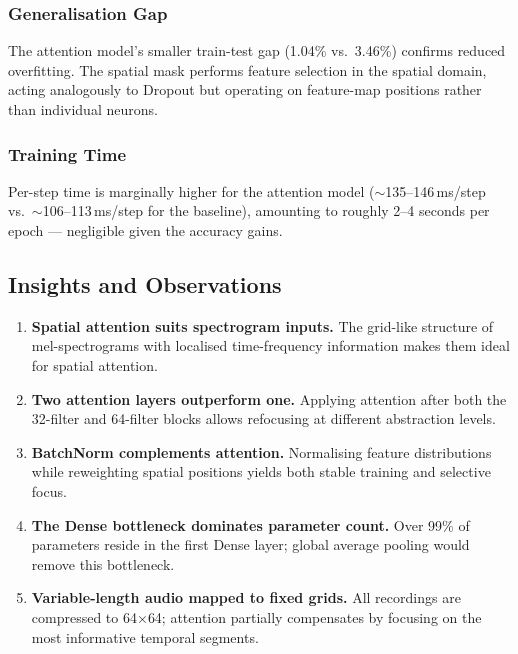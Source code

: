 \documentclass[12pt,a4paper]{article}
\begin{document}
\subsubsection{Generalisation Gap}

The attention model's smaller train-test gap (1.04\% vs.\ 3.46\%) confirms reduced
overfitting. The spatial mask performs feature selection in the spatial domain,
acting analogously to Dropout but operating on feature-map positions rather than
individual neurons.

\subsubsection{Training Time}

Per-step time is marginally higher for the attention model ($\sim$135--146\,ms/step
vs.\ $\sim$106--113\,ms/step for the baseline), amounting to roughly 2--4 seconds
per epoch — negligible given the accuracy gains.

\subsection{Insights and Observations}

\begin{enumerate}[leftmargin=1.5em]
    \item \textbf{Spatial attention suits spectrogram inputs.} The grid-like structure
          of mel-spectrograms with localised time-frequency information makes them
          ideal for spatial attention.
    \item \textbf{Two attention layers outperform one.} Applying attention after both
          the 32-filter and 64-filter blocks allows refocusing at different abstraction
          levels.
    \item \textbf{BatchNorm complements attention.} Normalising feature distributions
          while reweighting spatial positions yields both stable training and selective
          focus.
    \item \textbf{The Dense bottleneck dominates parameter count.} Over 99\% of
          parameters reside in the first Dense layer; global average pooling would
          remove this bottleneck.
    \item \textbf{Variable-length audio mapped to fixed grids.} All recordings are
          compressed to 64$\times$64; attention partially compensates by focusing on
          the most informative temporal segments.
\end{enumerate}
\end{document}

